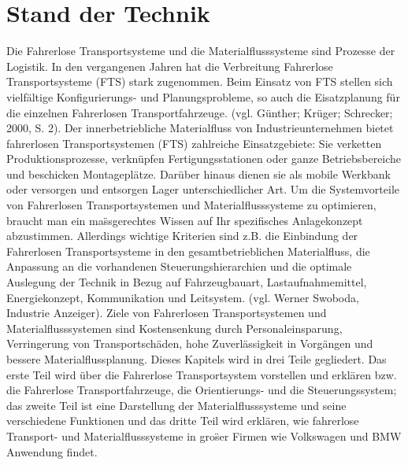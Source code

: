 \section{Stand der Technik}
Die Fahrerlose Transportsysteme und die Materialflusssysteme sind Prozesse der Logistik. In den vergangenen Jahren hat die Verbreitung Fahrerlose Transportsysteme (FTS) stark zugenommen. Beim Einsatz von FTS stellen sich vielf\"altige Konfigurierungs- und Planungsprobleme, so auch die Eisatzplanung f\"ur die einzelnen Fahrerlosen Transportfahrzeuge. (vgl. G\"unther; Kr\"uger; Schrecker; 2000, S. 2). Der innerbetriebliche Materialfluss von Industrieunternehmen bietet fahrerlosen Transportsystemen (FTS) zahlreiche Einsatzgebiete: Sie verketten Produktionsprozesse, verkn\"upfen Fertigungsstationen oder ganze Betriebsbereiche und beschicken Montagepl\"atze. Dar\"uber hinaus dienen sie als mobile Werkbank oder versorgen und entsorgen Lager unterschiedlicher Art. Um die Systemvorteile von Fahrerlosen Transportsystemen und Materialflusssysteme zu optimieren, braucht man ein ma\"ssgerechtes Wissen auf Ihr spezifisches Anlagekonzept abzustimmen. Allerdings wichtige Kriterien sind z.B. die Einbindung der Fahrerlosen Transportsysteme in den gesamtbetrieblichen Materialfluss, die Anpassung an die vorhandenen Steuerungshierarchien und die optimale Auslegung der Technik in Bezug auf Fahrzeugbauart, Lastaufnahmemittel, Energiekonzept, Kommunikation und Leitsystem. (vgl. Werner Swoboda, Industrie Anzeiger). Ziele von Fahrerlosen Transportsystemen und Materialflusssystemen sind Kostensenkung durch Personaleinsparung, Verringerung von Transportsch\"aden, hohe Zuverl\"assigkeit in Vorg\"angen und bessere Materialflussplanung.
Dieses Kapitels wird in drei Teile gegliedert. Das erste Teil wird \"uber die Fahrerlose Transportsystem vorstellen und erkl\"aren bzw. die Fahrerlose Transportfahrzeuge, die Orientierungs- und die Steuerungssystem; das zweite Teil ist eine Darstellung der Materialflusssysteme und seine verschiedene Funktionen und das dritte Teil wird erkl\"aren, wie fahrerlose Transport- und Materialflusssysteme in gro\"ser Firmen wie Volkswagen und BMW Anwendung findet.

